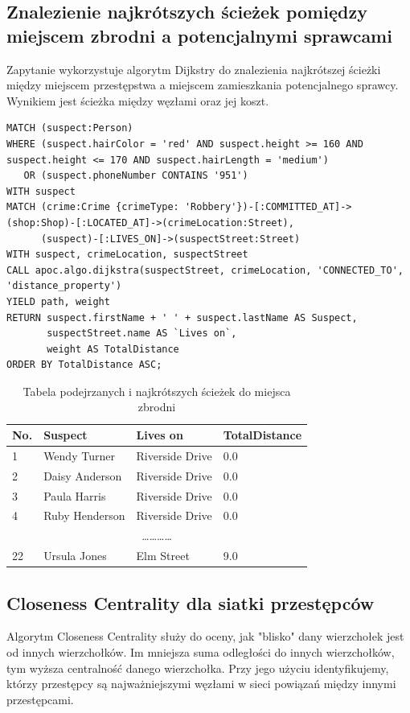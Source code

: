 \documentclass[a4paper,12pt]{article}
\begin{document}
\subsection*{Znalezienie najkrótszych ścieżek pomiędzy miejscem zbrodni a potencjalnymi sprawcami}
Zapytanie wykorzystuje algorytm Dijkstry do znalezienia najkrótszej ścieżki między miejscem przestępstwa a miejscem zamieszkania potencjalnego sprawcy. Wynikiem jest ścieżka między węzłami oraz jej koszt.
\begin{verbatim}
MATCH (suspect:Person)
WHERE (suspect.hairColor = 'red' AND suspect.height >= 160 AND suspect.height <= 170 AND suspect.hairLength = 'medium')
   OR (suspect.phoneNumber CONTAINS '951')
WITH suspect
MATCH (crime:Crime {crimeType: 'Robbery'})-[:COMMITTED_AT]->(shop:Shop)-[:LOCATED_AT]->(crimeLocation:Street),
      (suspect)-[:LIVES_ON]->(suspectStreet:Street)
WITH suspect, crimeLocation, suspectStreet
CALL apoc.algo.dijkstra(suspectStreet, crimeLocation, 'CONNECTED_TO', 'distance_property') 
YIELD path, weight
RETURN suspect.firstName + ' ' + suspect.lastName AS Suspect,
       suspectStreet.name AS `Lives on`,
       weight AS TotalDistance
ORDER BY TotalDistance ASC;
\end{verbatim}

\begin{table}[h!]
\centering
\begin{tabular}{|l|l|l|l|}
\hline
\textbf{No.} & \textbf{Suspect}       & \textbf{Lives on}       & \textbf{TotalDistance} \\ \hline
1           & Wendy Turner           & Riverside Drive          & 0.0                   \\ \hline
2           & Daisy Anderson         & Riverside Drive          & 0.0                   \\ \hline
3           & Paula Harris           & Riverside Drive          & 0.0                   \\ \hline
4           & Ruby Henderson         & Riverside Drive          & 0.0                   \\ \hline
\multicolumn{4}{|c|}{\dots\dots\dots\dots} \\ \hline
22          & Ursula Jones           & Elm Street               & 9.0                   \\ \hline
\end{tabular}
\caption{Tabela podejrzanych i najkrótszych ścieżek do miejsca zbrodni}
\end{table}

\subsection*{Closeness Centrality dla siatki przestępców}
Algorytm Closeness Centrality służy do oceny, jak "blisko" dany wierzchołek jest od innych wierzchołków. Im mniejsza suma odległości do innych wierzchołków, tym wyższa centralność danego wierzchołka.
Przy jego użyciu identyfikujemy, którzy przestępcy są najważniejszymi węzłami w sieci powiązań między innymi przestępcami.
\end{document}
